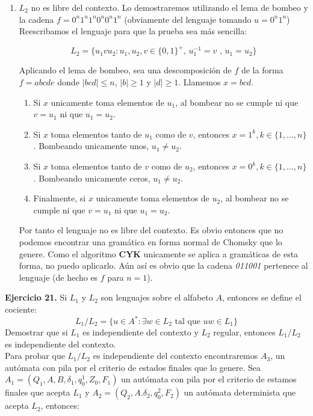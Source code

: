\documentclass[11pt,a4paper]{article}
\begin{document}
\begin{enumerate}
	\item $L_2$ no es libre del contexto. Lo demostraremos utilizando el lema de bombeo y la cadena $f = 0^n1^n1^n0^n0^n1^n$ (obviamente del lenguaje tomando $u = 0^n1^n$) Reescribamos el lenguaje para que la prueba sea más sencilla:
	
		$$L_2 = \{u_1vu_2 : u_1,u_2,v \in \{0, 1\}^+ \text{, } u_1^{-1} = v \text{ , } u_1 = u_2 \} $$
	
	Aplicando el lema de bombeo, sea una descomposición de $f$ de la forma $f = abcde$ donde $|bcd| \leq n$, $|b| \geq 1$ y $|d| \geq 1$. Llamemos $x = bcd$.
	
	\begin{enumerate}
		\item Si $x$ unicamente toma elementos de $u_1$, al bombear no se cumple ni que $v = u_1$ ni que $u_1 = u_2$.
		\item Si $x$ toma elementos tanto de $u_1$ como de $v$, entonces $x = 1^k, k \in \{1, ... , n\}$. Bombeando unicamente unos, $u_1 \neq u_2$.
		\item Si $x$ toma elementos tanto de $v$ como de $u_2$, entonces $x = 0^k, k \in \{1, ... , n\}$. Bombeando unicamente ceros,
		$u_1 \neq u_2$.
		\item Finalmente, si $x$ unicamente toma elementos de $u_2$, al bombear no se cumple ni que $v = u_1$ ni que $u_1 = u_2$.
	\end{enumerate}
	
	Por tanto el lenguaje no es libre del contexto. Es obvio entonces que no podemos encontrar una gramática en forma normal de Chomsky que lo genere. Como el algoritmo \textbf{CYK} unicamente se aplica a gramáticas de esta forma, no puedo aplicarlo. Aún así es obvio que la cadena \emph{011001} pertenece al lenguaje (de hecho es $f$ para $n = 1$). \\
\end{enumerate}


\textbf{Ejercicio 21.} Si $L_1$ y $L_2$ son lenguajes sobre el alfabeto $A$, entonces se define el cociente: $$L_1/L_2 = \{u \in A^* : \exists w \in L_2 \text { tal que } uw \in L_1 \}$$ Demostrar que si $L_1$ es independiente del contexto y $L_2$ regular, entonces $L_1/L_2$ es independiente del contexto. \\

Para probar que $L_1/L_2$ es independiente del contexto encontraremos $A_3$, un autómata con pila por el criterio de estados finales que lo genere. Sea $A_1 = (Q_1, A, B, \delta_1, q_0^1, Z_0, F_1)$ un autómata con pila por el criterio de estamos finales que acepta $L_1$ y $A_2 = (Q_2, A. \delta_2, q_0^2, F_2)$ un autómata determinista que acepta $L_2$, entonces:
\end{document}
